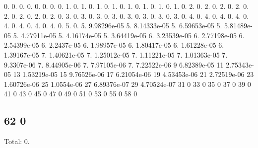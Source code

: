 0. 0. 0. 0. 0. 0. 0. 0. 1. 0. 1. 0. 1. 0. 1. 0. 1. 0. 1. 0. 1. 0. 1. 0. 2. 0. 2. 0. 2. 0. 2. 0. 2. 0. 2. 0. 2. 0. 2. 0. 3. 0. 3. 0. 3. 0. 3. 0. 3. 0. 3. 0. 3. 0. 3. 0. 4. 0. 4. 0. 4. 0. 4. 0. 4. 0. 4. 0. 4. 0. 4. 0. 5. 0. 5. 9.\+98296e-\/05 5. 8.\+14333e-\/05 5. 6.\+59653e-\/05 5. 5.\+81489e-\/05 5. 4.\+77911e-\/05 5. 4.\+16174e-\/05 5. 3.\+64419e-\/05 6. 3.\+23539e-\/05 6. 2.\+77198e-\/05 6. 2.\+54399e-\/05 6. 2.\+2437e-\/05 6. 1.\+98957e-\/05 6. 1.\+80417e-\/05 6. 1.\+61228e-\/05 6. 1.\+39167e-\/05 7. 1.\+40621e-\/05 7. 1.\+25012e-\/05 7. 1.\+11221e-\/05 7. 1.\+01363e-\/05 7. 9.\+3307e-\/06 7. 8.\+44905e-\/06 7. 7.\+97105e-\/06 7. 7.\+22522e-\/06 9 6.\+82389e-\/05 11 2.\+75343e-\/05 13 1.\+53219e-\/05 15 9.\+76526e-\/06 17 6.\+21054e-\/06 19 4.\+53453e-\/06 21 2.\+72519e-\/06 23 1.\+60726e-\/06 25 1.\+0554e-\/06 27 6.\+89376e-\/07 29 4.\+70524e-\/07 31 0 33 0 35 0 37 0 39 0 41 0 43 0 45 0 47 0 49 0 51 0 53 0 55 0 58 0 \subsection*{62 0 }

Total\+: 0. 